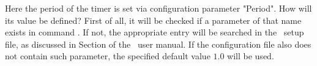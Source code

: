 Here the period of the timer is set via configuration parameter "Period". 
How will its value  be defined? 
First of all, it will be checked if a parameter of that name exists in command
. If not, the appropriate entry will be searched in the \dabc\ setup file,
as discussed in Section  of the \dabc\ user manual.
If the configuration file also does not contain such parameter, 
the specified default value $1.0$  will be used.


% 
% 
% 
% 
% 
% 
% 

